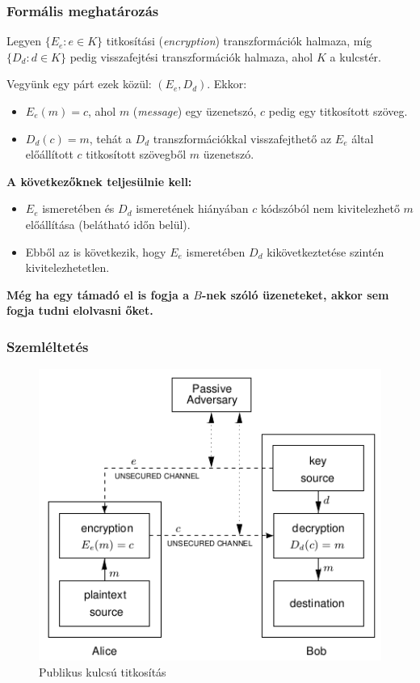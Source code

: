 \documentclass{beamer}
\begin{document}
\begin{frame}
    \frametitle{Formális meghatározás}

    Legyen $\{E_e: e \in K\}$ titkosítási (\textit{encryption}) transzformációk halmaza, míg $\{D_d: d \in K\}$
    pedig visszafejtési transzformációk halmaza, ahol $K$ a kulcstér.

    Vegyünk egy párt ezek közül: $(E_e, D_d)$. Ekkor:

    \begin{itemize}
        \item $E_e(m) = c$, ahol $m$ (\textit{message}) egy üzenetszó, $c$ pedig egy titkosított szöveg.
        \item $D_d(c) = m$, tehát a $D_d$ transzformációkkal visszafejthető az $E_e$ által előállított $c$ titkosított
              szövegből $m$ üzenetszó.
    \end{itemize}

    \textbf{A következőknek teljesülnie kell:}

    \begin{itemize}
        \item $E_e$ ismeretében és $D_d$ ismeretének hiányában $c$ kódszóból nem kivitelezhető $m$ előállítása (belátható
              időn belül).
        \item Ebből az is következik, hogy $E_e$ ismeretében $D_d$ kikövetkeztetése szintén kivitelezhetetlen.
    \end{itemize}

    \textbf{Még ha egy támadó el is fogja a $B$-nek szóló üzeneteket, akkor sem fogja tudni elolvasni őket.}
\end{frame}

\begin{frame}
    \frametitle{Szemléltetés}

    \begin{figure}[h]
        \centering
        \includegraphics[scale=0.5]{encryption.png}
        \caption{Publikus kulcsú titkosítás \cite{Menezes2001}}
        \label{fig_encryption}
    \end{figure}
\end{frame}
\end{document}
